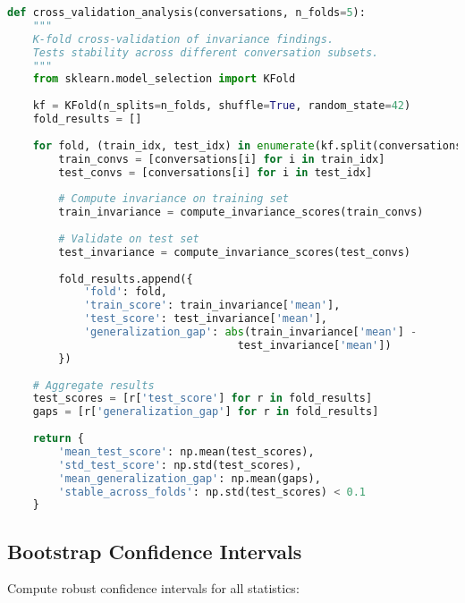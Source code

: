 \documentclass[11pt,letterpaper]{article}
\begin{document}
\begin{lstlisting}[language=Python]
def cross_validation_analysis(conversations, n_folds=5):
    """
    K-fold cross-validation of invariance findings.
    Tests stability across different conversation subsets.
    """
    from sklearn.model_selection import KFold
    
    kf = KFold(n_splits=n_folds, shuffle=True, random_state=42)
    fold_results = []
    
    for fold, (train_idx, test_idx) in enumerate(kf.split(conversations)):
        train_convs = [conversations[i] for i in train_idx]
        test_convs = [conversations[i] for i in test_idx]
        
        # Compute invariance on training set
        train_invariance = compute_invariance_scores(train_convs)
        
        # Validate on test set
        test_invariance = compute_invariance_scores(test_convs)
        
        fold_results.append({
            'fold': fold,
            'train_score': train_invariance['mean'],
            'test_score': test_invariance['mean'],
            'generalization_gap': abs(train_invariance['mean'] - 
                                    test_invariance['mean'])
        })
    
    # Aggregate results
    test_scores = [r['test_score'] for r in fold_results]
    gaps = [r['generalization_gap'] for r in fold_results]
    
    return {
        'mean_test_score': np.mean(test_scores),
        'std_test_score': np.std(test_scores),
        'mean_generalization_gap': np.mean(gaps),
        'stable_across_folds': np.std(test_scores) < 0.1
    }
\end{lstlisting}

\subsection{Bootstrap Confidence Intervals}

Compute robust confidence intervals for all statistics:
\end{document}
